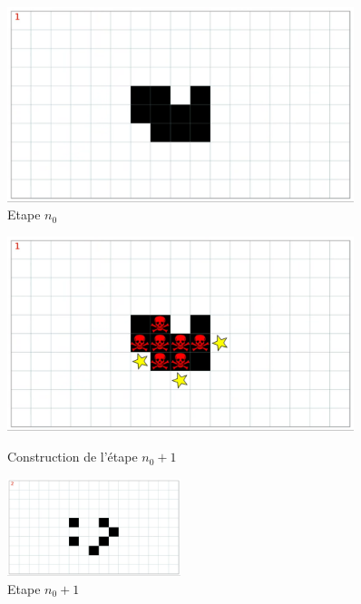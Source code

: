 \documentclass[12,french]{report}
\begin{document}
\begin{figure}[H]
    \begin{minipage}[c]{.46\linewidth}
        \centering
        \includegraphics[width=0.9\textwidth]{./Images/3}\\
        \caption{Etape $n_{0}$}
    \end{minipage}
    \hfill%
    \begin{minipage}[c]{.46\linewidth}
        \centering
        \includegraphics[width=0.9\textwidth]{./Images/4}\\
        \caption{Construction de l'étape $n_{0}+1$}
    \end{minipage}
\end{figure}%

\begin{figure}[H]
	\center
	\includegraphics[width=0.45\textwidth]{./Images/5}
	\caption{Etape $n_{0}+1$}
\end{figure}\vspace{0.2cm}
\end{document}
